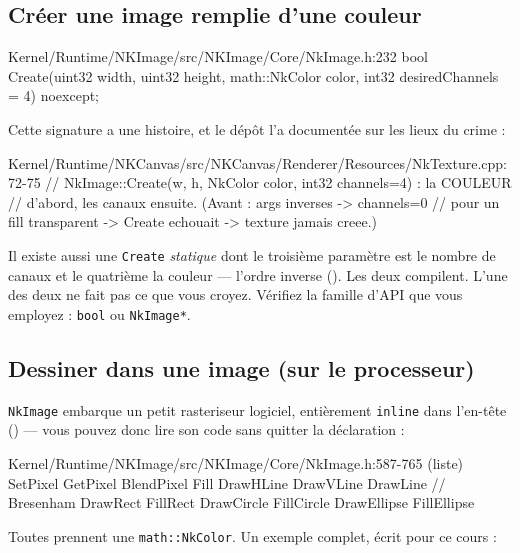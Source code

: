 \subsection{Créer une image remplie d'une couleur}

\begin{nkcode}{Kernel/Runtime/NKImage/src/NKImage/Core/NkImage.h:232}
bool Create(uint32 width, uint32 height, math::NkColor color,
            int32 desiredChannels = 4) noexcept;
\end{nkcode}

Cette signature a une histoire, et le dépôt l'a documentée sur les lieux du
crime :

\begin{nkcode}{Kernel/Runtime/NKCanvas/src/NKCanvas/Renderer/Resources/NkTexture.cpp:72-75}
                // NkImage::Create(w, h, NkColor color, int32 channels=4) : la COULEUR
                // d'abord, les canaux ensuite. (Avant : args inverses -> channels=0
                // pour un fill transparent -> Create echouait -> texture jamais creee.)
\end{nkcode}

\begin{nkpiege}
Il existe aussi une \texttt{Create} \emph{statique} dont le troisième paramètre
est le nombre de canaux et le quatrième la couleur — l'ordre inverse
(). Les deux compilent. L'une des deux ne fait pas ce
que vous croyez. Vérifiez la famille d'API que vous employez : \texttt{bool} ou
\texttt{NkImage*}.
\end{nkpiege}

\subsection{Dessiner dans une image (sur le processeur)}

\texttt{NkImage} embarque un petit rasteriseur logiciel, entièrement
\texttt{inline} dans l'en-tête () — vous pouvez
donc lire son code sans quitter la déclaration :

\begin{nkcode}{Kernel/Runtime/NKImage/src/NKImage/Core/NkImage.h:587-765 (liste)}
SetPixel  GetPixel  BlendPixel  Fill
DrawHLine  DrawVLine  DrawLine        // Bresenham
DrawRect   FillRect
DrawCircle FillCircle
DrawEllipse FillEllipse
\end{nkcode}

Toutes prennent une \texttt{math::NkColor}. Un exemple complet, écrit pour ce
cours :

